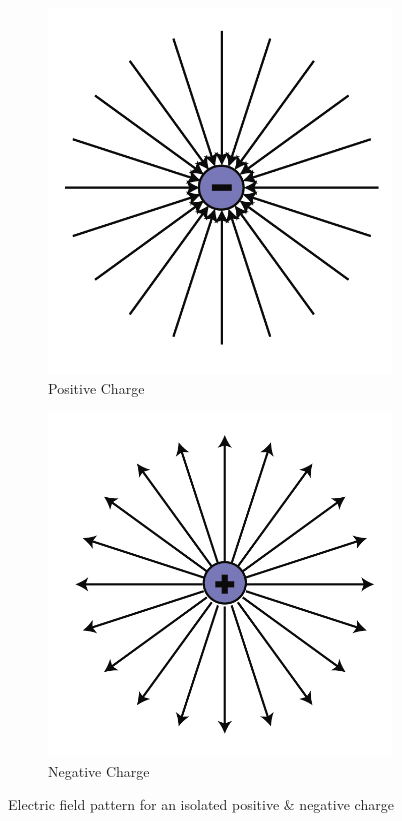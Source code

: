 \begin{figure}[htbp]
  \centering
  \begin{subfigure}[b]{0.3\textwidth}
      \includegraphics[width=\textwidth]{Images/11.4a}
      \caption{Positive Charge}
      \label{fig:11.4a}
  \end{subfigure}
  \begin{subfigure}[b]{0.3\textwidth}
      \includegraphics[width=\textwidth]{Images/11.4b}
      \caption{Negative Charge}
      \label{fig:11.4b}
  \end{subfigure}
  \caption[]{Electric field pattern for an isolated positive \& negative charge}
  \label{fig:11.4}
\end{figure}

